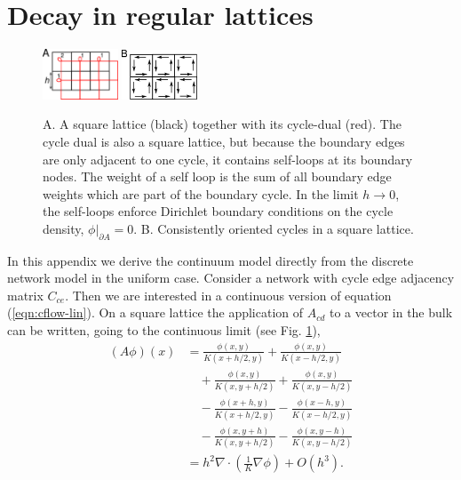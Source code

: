 \documentclass[10pt,aps,pra,twocolumn,superscriptaddress]{revtex4-1}
\begin{document}
\section{Decay in regular lattices}
\label{sec:proof-regular}
\begin{figure}
    \begin{center}
        \includegraphics[width=0.2\textwidth]{pics/DualLattice.pdf} \quad
        \includegraphics[width=0.2\textwidth]{pics/OrientedCycles.pdf}
    \end{center}
    \caption{A. A square lattice (black) together with its cycle-dual
    (red).
    The cycle dual is also a square lattice, but because the boundary
    edges are only adjacent to one cycle, it contains self-loops
    at its boundary nodes. The weight of a self loop is the sum
    of all boundary edge weights which are part of the boundary cycle.
    In the limit $h\rightarrow 0$, the self-loops enforce Dirichlet
    boundary conditions on the cycle density, $\phi|_{\partial A} = 0$.
    B. Consistently oriented cycles in a square lattice.
    \label{fig:cycles-lattice}}
\end{figure}
In this appendix we derive the continuum model directly from the discrete
network model in the uniform case. Consider a network with
cycle edge adjacency matrix $C_{ce}$. Then we are interested in a
continuous version of equation (\ref{eqn:cflow-lin}).
On a square lattice the application of $A_{cd}$ to a vector in the 
bulk can be written, going to the continuous limit (see Fig. \ref{fig:cycles-lattice}),
\begin{align}
    (A\phi)(x) &= \frac{\phi(x,y)}{K(x + h/2,y)} 
    +\frac{\phi(x,y)}{K(x - h/2,y)} \\
    &\quad+ \frac{\phi(x,y)}{K(x,y+h/2)}
    + \frac{\phi(x,y)}{K(x,y-h/2)} \\
    &\quad -\frac{\phi(x+h,y)}{K(x+h/2,y)}
    -\frac{\phi(x-h,y)}{K(x-h/2,y)} \\
    &\quad-\frac{\phi(x,y+h)}{K(x,y+h/2)}
    -\frac{\phi(x,y-h)}{K(x,y-h/2)} \\
    &= h^2 \nabla \cdot \left(\frac{1}{K} \nabla \phi\right) + O(h^3).
\end{align}
\end{document}
